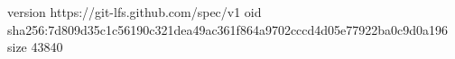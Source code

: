 version https://git-lfs.github.com/spec/v1
oid sha256:7d809d35c1c56190c321dea49ac361f864a9702cccd4d05e77922ba0c9d0a196
size 43840
